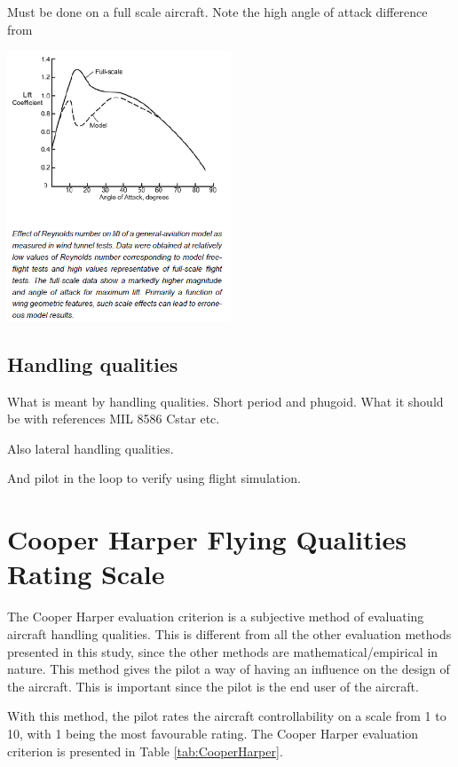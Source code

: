 \documentclass{report}
\begin{document}
Must be done on a full scale aircraft.  Note the high angle of attack difference from \cite{ModelFlightNASA}


\includegraphics[width = 0.5\textwidth]{Pictures/ModelAeroVSFullSize.png}

\subsection{Handling qualities}

What is meant by handling qualities. Short period and phugoid. What it should be with references
MIL 8586
Cstar etc.

Also lateral handling qualities.

And pilot in the loop to verify using flight simulation.


\section{Cooper Harper Flying Qualities Rating Scale}\label{Sec:  CooperHarperMethodExplain}


The Cooper Harper evaluation criterion \citep{CooperHarper} is a subjective method of evaluating aircraft handling qualities.  This is different from all the other evaluation methods presented in this study, since the other methods are mathematical/empirical in nature.  This method gives the pilot a way of having an influence on the design of the aircraft.  This is important since the pilot is the end user of the aircraft.

With this method, the pilot rates the aircraft controllability on a scale from 1 to 10, with 1 being the most favourable rating.  The Cooper Harper evaluation criterion is presented in Table \ref{tab:CooperHarper}.  
\end{document}
